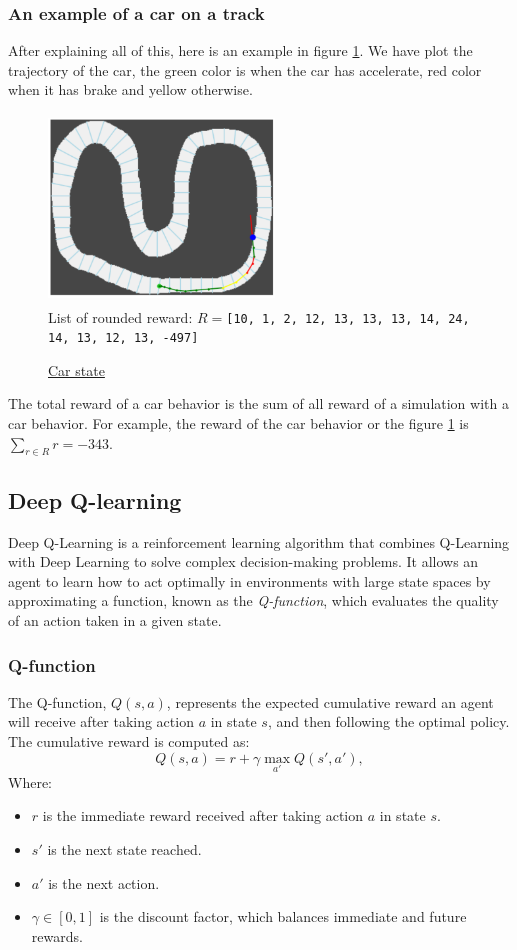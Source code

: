 \documentclass[11pt,a4paper]{article}
\newcounter{fig}
\newcommand{\mlist}[1]{\begin{itemize}[noitemsep,topsep=0pt]#1\end{itemize}}
\begin{document}
			\subsubsection*{An example of a car on a track}
After explaining all of this, here is an example in figure \ref{figure:env example}. We have plot the trajectory of the car, the green color is when the car has accelerate, red color when it has brake and yellow otherwise.
\begin{center}
	\begin{figure}[ht]
		\centering
		\includegraphics[width=6cm, height=5cm]{env_example.png}\\
		List of rounded reward: $R=$\texttt{[10, 1, 2, 12, 13, 13, 13, 14, 24, 14, 13, 12, 13, -497]}
		\caption{\underline{Car state}}
		\label{figure:env example}
	\end{figure}
\end{center}
The total reward of a car behavior is the sum of all reward of a simulation with a car behavior. For example, the reward of the car behavior or the figure \ref{figure:env example} is $\underset{r \in R}{\sum} r= -343$.


		\subsection*{Deep Q-learning}
Deep Q-Learning is a reinforcement learning algorithm that combines Q-Learning with Deep Learning to solve complex decision-making problems. It allows an agent to learn how to act optimally in environments with large state spaces by approximating a function, known as the \textit{Q-function}, which evaluates the quality of an action taken in a given state.
    
            \subsubsection*{Q-function}
The Q-function, $Q(s, a)$, represents the expected cumulative reward an agent will receive after taking action $a$ in state $s$, and then following the optimal policy. The cumulative reward is computed as:
\[Q(s, a) = r + \gamma \max_{a'} Q(s', a'),\]
Where:
\mlist{
\item $r$ is the immediate reward received after taking action $a$ in state $s$.
\item $s'$ is the next state reached.
\item $a'$ is the next action.
\item $\gamma \in [0, 1]$ is the discount factor, which balances immediate and future rewards.
}
    
\end{document}
